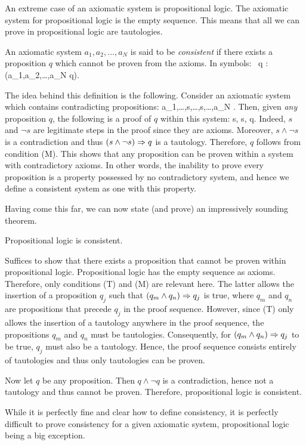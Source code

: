 An extreme case of an axiomatic system is propositional logic.
The axiomatic system for propositional logic is the empty sequence.
This means that all we can prove in propositional logic are tautologies.

\bd
An axiomatic system $a_1,a_2,\ldots,a_N$ is said to be \emph{consistent} if there exists a proposition $q$ which cannot be proven from the axioms.
In symbols:
\bse
\exists \, q : \neg (a_1,a_2,\ldots,a_N \vdash q).
\ese
\ed

The idea behind this definition is the following.
Consider an axiomatic system which contains contradicting propositions:
\bse
a_1,\ldots,s,\ldots,\neg s,\ldots,a_N .
\ese
Then, given \emph{any} proposition $q$, the following is a proof of $q$ within this system:
\bse
s, \neg s, q.
\ese
Indeed, $s$ and $\neg s$ are legitimate steps in the proof since they are axioms.
Moreover, $s\land \neg s$ is a contradiction and thus $(s\land \neg s) \Rightarrow q$ is a tautology.
Therefore, $q$ follows from condition (M).
This shows that any proposition can be proven within a system with contradictory axioms.
In other words, the inability to prove every proposition is a property possessed by no contradictory system, and hence we define a consistent system as one with this property.

Having come this far, we can now state (and prove) an impressively sounding theorem.

\bt
Propositional logic is consistent.
\et

\bq
Suffices to show that there exists a proposition that cannot be proven within propositional logic. Propositional logic has the empty sequence as axioms.
Therefore, only conditions (T) and (M) are relevant here.
The latter allows the insertion of a proposition $q_j$ such that $(q_m\land q_n) \Rightarrow q_j$ is true, where $q_m$ and $q_n$ are propositions that precede $q_j$ in the proof sequence.
However, since (T) only allows the insertion of a tautology anywhere in the proof sequence, the propositions $q_m$ and $q_n$ must be tautologies.
Consequently, for $(q_m\land q_n) \Rightarrow q_j$ to be true, $q_j$ must also be a tautology.
Hence, the proof sequence consists entirely of tautologies and thus only tautologies can be proven.

Now let $q$ be any proposition.
Then $q\land \neg q$ is a contradiction, hence not a tautology and thus cannot be proven.
Therefore, propositional logic is consistent.
\eq

\br
While it is perfectly fine and clear how to define consistency, it is perfectly difficult to prove consistency for a given axiomatic system, propositional logic being a big exception.
\er

